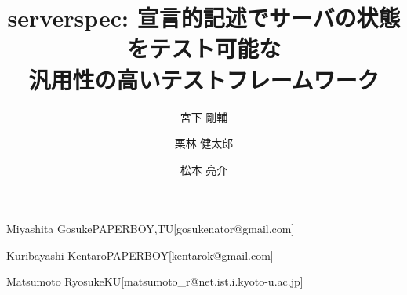 \documentclass[submit,techreq,noauthor]{ipsj}
\begin{document}
\title{serverspec: 宣言的記述でサーバの状態をテスト可能な\\
汎用性の高いテストフレームワーク}




\author{宮下 剛輔}{Miyashita Gosuke}{PAPERBOY,TU}[gosukenator@gmail.com]
\author{栗林 健太郎}{Kuribayashi Kentaro}{PAPERBOY}[kentarok@gmail.com]
\author{松本 亮介}{Matsumoto Ryosuke}{KU}[matsumoto\_r@net.ist.i.kyoto-u.ac.jp]

\maketitle



\begin{thebibliography}{99}

\end{thebibliography}
\end{document}
